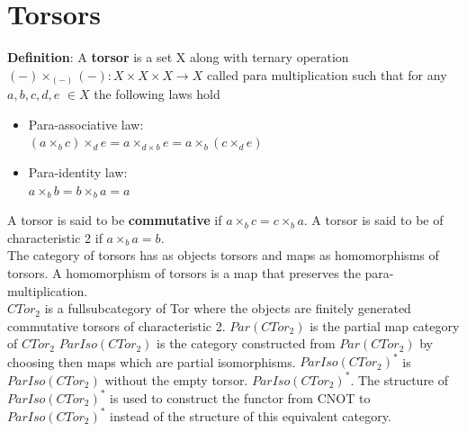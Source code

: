 \documentclass[11pt, oneside]{amsart}
\theoremstyle{definition}
\theoremstyle{definition}
\begin{document}
\section{Torsors}
\textbf{Definition}: A \textbf{torsor} is a set X along with ternary operation $(-)\times_{(-)}(-): {X}\times{X}\times{X}\to {X}$ called para multiplication such that for any $a, b, c, d, e$ $\in X$ the following laws hold\\
\begin{itemize}
\item Para-associative law:\\
$(a\times_{b}c)\times_{d}e=a\times_{d\times{b}}{e}=a\times_{b}(c\times_{d}e)$\\
\item Para-identity law:\\
$a\times_{b}b=b\times_{b}a=a$\\
\end{itemize}
A torsor is said to be \textbf{commutative} if $a\times_{b}c=c\times_{b}a$. A torsor is said to be of characteristic 2 if $a\times_{b}a=b$.\\
The category of torsors has as objects torsors and maps as homomorphisms of torsors. A homomorphism of torsors is a map that preserves the para-multiplication.\\
$CTor_{2}$ is a fullsubcategory of Tor where the objects are finitely generated commutative torsors of characteristic 2. $Par(CTor_{2})$ is the partial map category of $CTor_{2}$ $ParIso(CTor_{2})$ is the category constructed from $Par(CTor_{2})$ by choosing then maps which are partial isomorphisms.
$ParIso(CTor_{2})^*$ is $ParIso(CTor_{2})$ without the empty torsor. $ParIso(CTor_{2})^*$. The  structure of $ParIso(CTor_{2})^*$ is used  to construct the functor from CNOT to $ParIso(CTor_{2})^*$ instead of the structure of this equivalent category.
\end{document}
